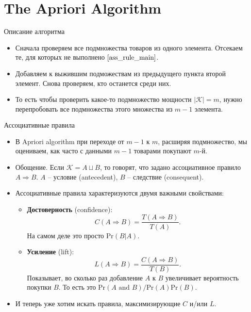 \documentclass[9pt]{beamer}
\begin{document}
\section{The Apriori Algorithm}

\begin{frame}{Описание алгоритма}
\begin{itemize}
    \item Сначала проверяем все подмножества товаров из одного элемента. Отсекаем те, для которых не выполнено $\eqref{ass_rule_main}$.
    \item Добавляем к выжившим подможествам из предыдущего пункта второй элемент. Снова проверяем, кто останется среди них.
    \item То есть чтобы проверить какое-то подмножество мощности $|\mathcal{K}| = m$, нужно перепробовать все подмножества этого множества из $m-1$ элемента.
\end{itemize}
\end{frame}

\begin{frame}{Ассоциативные правила}
\begin{itemize}
    \item В Apriori algorithm при переходе от $m-1$ к $m$, расширяя подмножество, мы оцениваем, как часто с данными $m-1$ товарами покупают $m$-й.
    \item Обощение. Если $\mathcal{K} = A\sqcup B$, то говорят, что задано ассоциативное правило $A \Rightarrow B$. $A$ -- условие (antecedent), $B$ -- следствие (consequent).
    \item Ассоциативные правила характеризуются двумя важными свойствами:
    \begin{itemize}
        \item \textbf{Достоверность} (confidence): 
        $$C(A \Rightarrow B) = \frac{T(A \Rightarrow B)}{T(A)}.$$
        На самом деле это просто $\text{Pr} (B|A)$.
        \item \textbf{Усиление} (lift):
        $$L(A \Rightarrow B) = \frac{C(A \Rightarrow B)}{T(B)}.$$
        Показывает, во сколько раз добавление $A$ к $B$ увеличивает вероятность покупки $B$. То есть это $\text{Pr}(A\text{ and }B) / \text{Pr}(A)\text{Pr}(B)$.
    \end{itemize}
    \item И теперь уже хотим искать правила, максимизирующие $C$ и/или $L$.
\end{itemize}
\end{frame}
\end{document}

